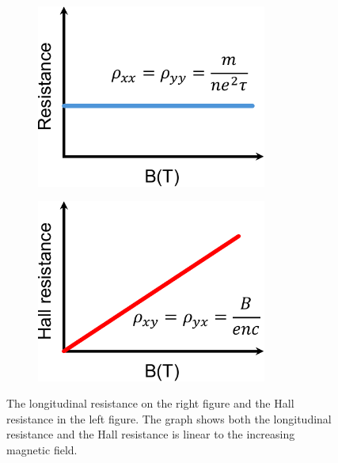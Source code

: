 \documentclass{report}
\begin{document}
\begin{figure}[htb]
	\centering
	\begin{subfigure}[b]{0.495\textwidth}
		\centering
		{\includegraphics[width=0.83\textwidth,height=0.8\textwidth]{pic/classRess.pdf}}
	\end{subfigure}
	\begin{subfigure}[b]{0.495\textwidth}
		\centering
		\includegraphics[width=0.83\textwidth,height=0.8\textwidth]{pic/HallRess.pdf}
	\end{subfigure}
	\caption{
		The longitudinal resistance on the right figure and the Hall resistance in the left figure. The graph shows both the longitudinal resistance and the Hall resistance is linear to the increasing magnetic field.
	}
\end{figure}
\end{document}
